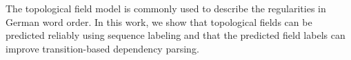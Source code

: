 The topological field model is commonly used to describe the regularities in German word order. In this work, we show that topological fields can be predicted reliably using sequence labeling and that the predicted field labels can improve transition-based dependency parsing.

